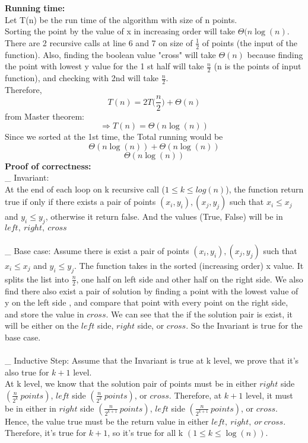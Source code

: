 \documentclass[11pt]{article}
\newcommand{\tab}{\hspace*{2em}}
\begin{document}
\noindent
\textbf{Running time:}\\
Let T(n) be the run time of the algorithm with size of n points.\\
Sorting the point by the value of x in increasing order will take $\Theta(n\log(n)$. 
There are 2 recursive calls at line 6 and 7 on size of $\frac{1}{2}$ of points (the input of the function). Also, finding the boolean value "cross" will take $\Theta(n)$ because finding the point with lowest y value for the 1 st half will take $\frac{n}{2}$ (n is the points of input function), and checking with 2nd will take $\frac{n}{2}$.\\
Therefore,
$$T(n) = 2T\Big(\frac{n}{2}\Big) + \Theta(n)$$
from Master theorem:
$$\Rightarrow T(n) = \Theta(n\log(n))$$
Since we sorted at the 1st time, the Total running would be 
$$\Theta(n\log(n)) + \Theta(n\log(n))$$
$$\boxed{\Theta(n\log(n))}$$
\noindent
\textbf{Proof of correctness:}\\
\_ Invariant:\\
\tab At the end of each loop on k recursive call ($1 \leqslant k \leqslant log(n) $), the function return true if only if there exists a pair of points $(x_i,y_i),(x_j,y_j)$ such that $x_i \leqslant x_j$ and $y_i\leqslant y_j$, otherwise it return false. And the values (True, False) will be in $left,\ right,\ cross$\\
\\
\_ Base case: Assume there is exist a pair of points $(x_i,y_i),(x_j,y_j)$ such that $x_i \leqslant x_j$ and $y_i\leqslant y_j$. The function takes in the sorted (increasing order) x value. It splits the list into $\frac{n}{2}$, one half on left side and other half on the right side. We also find there also exist a pair of solution by finding a point with the lowest value of y on the left side , and compare that point with every point on the right side, and store the value in $cross$. We can see that the if the solution pair is exist, it will be either on the $left$ side, $right$ side, or $cross$. So the Invariant is true for the base case.\\
\\
\_ Inductive Step: Assume that the Invariant is true at k level, we prove that it's also true for $k + 1$ level.\\
At k level, we know that the solution pair of points must be in either $right$ side $(\frac{n}{2^k}\ points)$, $left$ side $(\frac{n}{2^k}\ points)$, or $cross$.
Therefore, at $k +1$ level, it must be in either in $right$ side $(\frac{n}{2^{k+1}}\ points)$, $left$ side $(\frac{n}{2^{k+1}}\ points)$, or $cross$. Hence, the value true must be the return value in either $left,\ right,\ or\ cross$. Therefore, it's true for $k + 1$, so it's true for all k $(1 \leqslant k \leqslant \log(n))$.
\end{document}
